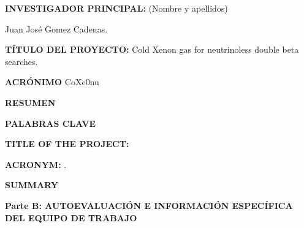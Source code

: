 \documentclass[a4paper,11pt,oneside]{article}
\begin{document}



\vspace{6pt}

\noindent\textbf{INVESTIGADOR PRINCIPAL:} (Nombre y apellidos)

\noindent Juan Jos\'e Gomez Cadenas.
\vspace{6pt}


\noindent 
\vspace{6pt}

\noindent\textbf{TÍTULO DEL PROYECTO:} Cold Xenon gas for neutrinoless double beta searches.
\vspace{6pt}

\noindent\textbf{ACR\'ONIMO} CoXe0nu


\noindent\textbf{RESUMEN} 
{\color{blue}{M\'aximo 2000 caracteres (incluyendo espacios en blanco):}}
\vspace{12pt}


\noindent\textbf{PALABRAS CLAVE} 


\noindent\textbf{TITLE OF THE PROJECT:} 
\vspace{6pt}

\noindent\textbf{ACRONYM:} .
\vspace{6pt}

\noindent\textbf{SUMMARY} 
{\color{blue}{ Maximum 2000 characters (including spaces):}}
\vspace{6pt}

\newpage

\setcounter{page}{1}

\begin{tcolorbox}[width=16.7cm,colback=yellow,arc=0pt,outer arc=0pt,colframe=black,boxrule=0.6pt,left=0mm, boxsep=0mm, left=2mm]
  \noindent\textbf{Parte B: AUTOEVALUACI\'ON E INFORMACI\'ON ESPEC\'IFICA DEL EQUIPO DE TRABAJO}
\end{tcolorbox}


 
\end{document}
